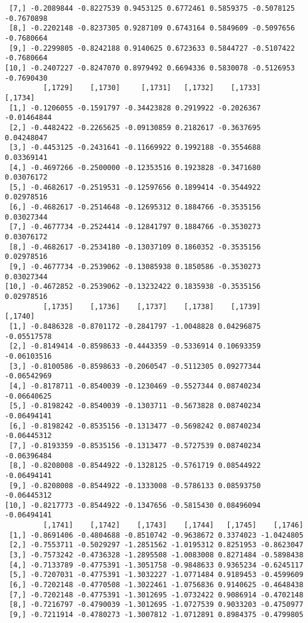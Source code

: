 \documentclass[
  letterpaper,
  DIV=11,
  numbers=noendperiod]{scrreprt}
\begin{document}
\begin{verbatim}
 [7,] -0.2089844 -0.8227539 0.9453125 0.6772461 0.5859375 -0.5078125 -0.7670898
 [8,] -0.2202148 -0.8237305 0.9287109 0.6743164 0.5849609 -0.5097656 -0.7680664
 [9,] -0.2299805 -0.8242188 0.9140625 0.6723633 0.5844727 -0.5107422 -0.7680664
[10,] -0.2407227 -0.8247070 0.8979492 0.6694336 0.5830078 -0.5126953 -0.7690430
         [,1729]    [,1730]     [,1731]   [,1732]    [,1733]     [,1734]
 [1,] -0.1206055 -0.1591797 -0.34423828 0.2919922 -0.2026367 -0.01464844
 [2,] -0.4482422 -0.2265625 -0.09130859 0.2182617 -0.3637695  0.04248047
 [3,] -0.4453125 -0.2431641 -0.11669922 0.1992188 -0.3554688  0.03369141
 [4,] -0.4697266 -0.2500000 -0.12353516 0.1923828 -0.3471680  0.03076172
 [5,] -0.4682617 -0.2519531 -0.12597656 0.1899414 -0.3544922  0.02978516
 [6,] -0.4682617 -0.2514648 -0.12695312 0.1884766 -0.3535156  0.03027344
 [7,] -0.4677734 -0.2524414 -0.12841797 0.1884766 -0.3530273  0.03076172
 [8,] -0.4682617 -0.2534180 -0.13037109 0.1860352 -0.3535156  0.02978516
 [9,] -0.4677734 -0.2539062 -0.13085938 0.1850586 -0.3530273  0.03027344
[10,] -0.4672852 -0.2539062 -0.13232422 0.1835938 -0.3535156  0.02978516
         [,1735]    [,1736]    [,1737]    [,1738]    [,1739]     [,1740]
 [1,] -0.8486328 -0.8701172 -0.2841797 -1.0048828 0.04296875 -0.05517578
 [2,] -0.8149414 -0.8598633 -0.4443359 -0.5336914 0.10693359 -0.06103516
 [3,] -0.8100586 -0.8598633 -0.2060547 -0.5112305 0.09277344 -0.06542969
 [4,] -0.8178711 -0.8540039 -0.1230469 -0.5527344 0.08740234 -0.06640625
 [5,] -0.8198242 -0.8540039 -0.1303711 -0.5673828 0.08740234 -0.06494141
 [6,] -0.8198242 -0.8535156 -0.1313477 -0.5698242 0.08740234 -0.06445312
 [7,] -0.8193359 -0.8535156 -0.1313477 -0.5727539 0.08740234 -0.06396484
 [8,] -0.8208008 -0.8544922 -0.1328125 -0.5761719 0.08544922 -0.06494141
 [9,] -0.8208008 -0.8544922 -0.1333008 -0.5786133 0.08593750 -0.06445312
[10,] -0.8217773 -0.8544922 -0.1347656 -0.5815430 0.08496094 -0.06494141
         [,1741]    [,1742]    [,1743]    [,1744]   [,1745]    [,1746]
 [1,] -0.8691406 -0.4804688 -0.8510742 -0.9638672 0.3374023 -1.0424805
 [2,] -0.7553711 -0.5029297 -1.2851562 -1.0195312 0.8251953 -0.8623047
 [3,] -0.7573242 -0.4736328 -1.2895508 -1.0083008 0.8271484 -0.5898438
 [4,] -0.7133789 -0.4775391 -1.3051758 -0.9848633 0.9365234 -0.6245117
 [5,] -0.7207031 -0.4775391 -1.3032227 -1.0771484 0.9189453 -0.4599609
 [6,] -0.7202148 -0.4770508 -1.3022461 -1.0756836 0.9140625 -0.4648438
 [7,] -0.7202148 -0.4775391 -1.3012695 -1.0732422 0.9086914 -0.4702148
 [8,] -0.7216797 -0.4790039 -1.3012695 -1.0727539 0.9033203 -0.4750977
 [9,] -0.7211914 -0.4780273 -1.3007812 -1.0712891 0.8984375 -0.4799805

\end{verbatim}
\end{document}
